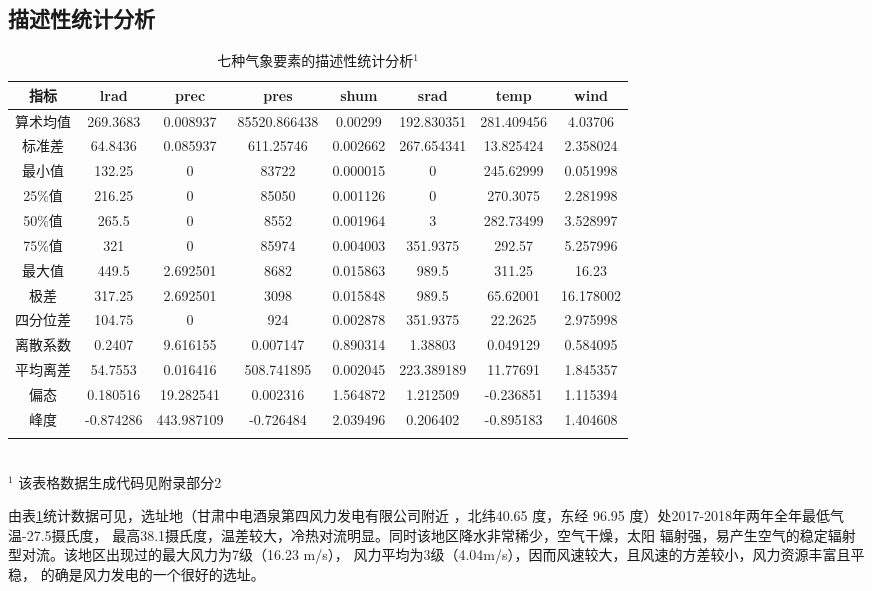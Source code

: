 \documentclass[AutoFakeBold]{LZUThesis}
\begin{document}
\subsection{描述性统计分析}

\begin{table}[H]
    \centering
    \caption{七种气象要素的描述性统计分析$^1$}
    \begin{tabular}{cccccccc}
    \toprule
    指标 & lrad & prec & pres & shum & srad & temp & wind \\
    \midrule
    算术均值 & 269.3683 & 0.008937 & 85520.866438 & 0.00299 & 192.830351 & 281.409456 & 4.03706 \\
    标准差 & 64.8436 & 0.085937 & 611.25746 & 0.002662 & 267.654341 & 13.825424 & 2.358024 \\
    最小值 & 132.25 & 0 & 83722 & 0.000015 & 0 & 245.62999 & 0.051998 \\
    25\%值 & 216.25 & 0 & 85050 & 0.001126 & 0 & 270.3075 & 2.281998 \\
    50\%值 & 265.5 & 0 & 8552 & 0.001964 & 3 & 282.73499 & 3.528997 \\
    75\%值 & 321 & 0 & 85974 & 0.004003 & 351.9375 & 292.57 & 5.257996 \\
    最大值 & 449.5 & 2.692501 & 8682 & 0.015863 & 989.5 & 311.25 & 16.23 \\
    极差 & 317.25 & 2.692501 & 3098 & 0.015848 & 989.5 & 65.62001 & 16.178002 \\
    四分位差 & 104.75 & 0 & 924 & 0.002878 & 351.9375 & 22.2625 & 2.975998 \\
    离散系数 & 0.2407 & 9.616155 & 0.007147 & 0.890314 & 1.38803 & 0.049129 & 0.584095 \\
    平均离差 & 54.7553 & 0.016416 & 508.741895 & 0.002045 & 223.389189 & 11.77691 & 1.845357 \\
    偏态 & 0.180516 & 19.282541 & 0.002316 & 1.564872 & 1.212509 & -0.236851 & 1.115394 \\
    峰度 & -0.874286 & 443.987109 & -0.726484 & 2.039496 & 0.206402 & -0.895183 & 1.404608 \\
    \bottomrule \\
    \end{tabular} \\
    \footnotesize{$^1$ 该表格数据生成代码见附录部分2} \\
    \label{analysis}
\end{table}

由表\ref{analysis}统计数据可见，选址地（甘肃中电酒泉第四风力发电有限公司附近
，北纬40.65 度，东经 96.95 度）处2017-2018年两年全年最低气温-27.5摄氏度，
最高38.1摄氏度，温差较大，冷热对流明显。同时该地区降水非常稀少，空气干燥，太阳
辐射强，易产生空气的稳定辐射型对流。该地区出现过的最大风力为7级（16.23 m/s），
风力平均为3级（4.04m/s），因而风速较大，且风速的方差较小，风力资源丰富且平稳，
的确是风力发电的一个很好的选址。
\end{document}
